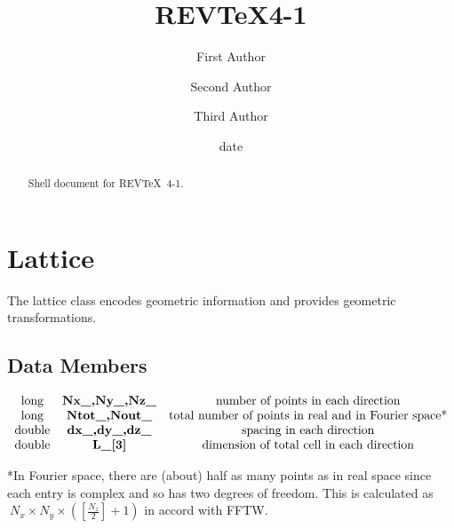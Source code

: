 \documentclass[aps,preprint]{revtex4-1}%
\begin{document}
\title[Short title for running header]{REV\TeX 4-1}
\author{First Author}
\author{Second Author}
\author{Third Author}

\begin{abstract}
Shell document for REV\TeX\ 4-1.

\end{abstract}
\date[Date text]{date}




\maketitle


\section{Lattice}

The lattice class encodes geometric information and provides geometric transformations.

\subsection{Data Members}

$%
\begin{array}
[c]{ccc}%
\text{long} & \text{\textbf{Nx\_,Ny\_,Nz\_}} & \text{number of points in each
direction}\\
\text{long} & \text{\textbf{Ntot\_,Nout\_}} & \text{total number of points in
real and in Fourier space*}\\
\text{double} & \text{\textbf{dx\_,dy\_,dz\_}} & \text{spacing in each
direction}\\
\text{double} & \text{\textbf{L\_[3]}} & \text{dimension of total cell in each
direction}%
\end{array}
$

*In Fourier space, there are (about) half as many points as in real space
since each entry is complex and so has two degrees of freedom. This is
calculated as $\ N_{x}\times N_{y}\times\left(  \left[  \frac{N_{z}}%
{2}\right]  +1\right)  $ in accord with FFTW. 
\end{document}
